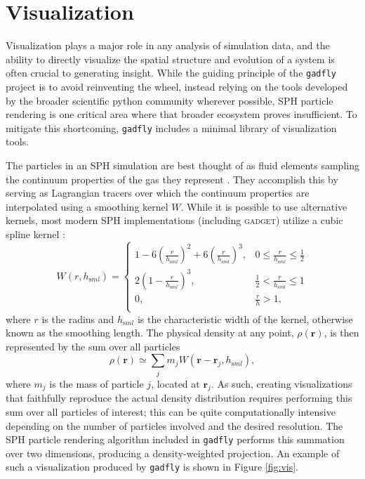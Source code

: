 \documentclass{thesis}
\newcommand{\code}[1]{\texttt{#1}}
\begin{document}
\section{Visualization}
\label{sec:vis}
Visualization plays a major role in any analysis of simulation data, and the ability to directly visualize the spatial structure and evolution of a system is often crucial to generating insight.
While the guiding principle of the \code{gadfly} project is to avoid reinventing the wheel, instead relying on the tools developed by the broader scientific python community wherever possible, SPH particle rendering is one critical area where that broader ecosystem proves insufficient.  
To mitigate this shortcoming, \code{gadfly} includes a minimal library of visualization tools.

The particles in an SPH simulation are best thought of as fluid elements sampling the continuum properties of the gas they represent \citep{Lucy1977,GingoldMonaghan1977,Monaghan1992,Springel2010}.  They accomplish this by serving as Lagrangian tracers over which the continuum properties are interpolated using a smoothing kernel $W$. While it is possible to use alternative kernels, most modern SPH implementations (including \textsc{gadget}) utilize a cubic spline kernel \citep{Springel2014}: 
\begin{equation}
W(r,h_{\mathrm sml}) =
     \begin{cases}
       1 - 6 \left( \frac{r}{h_{\mathrm sml}} \right)^2 + 6 \left( \frac{r}{h_{\mathrm sml}} \right)^3, & 0 \leq \frac{r}{h_{\mathrm sml}} \leq \frac{1}{2}\\
       2 \left(1 - \frac{r}{h_{\mathrm sml}}\right)^3, & \frac{1}{2} < \frac{r}{h_{\mathrm sml}} \leq 1\\
       0, & \frac{r}{h} >  1,\\
     \end{cases}
\end{equation}
where $r$ is the radius and $h_{\mathrm sml}$ is the characteristic width of the kernel, otherwise known as the smoothing length.  The physical density at any point, $\rho(\mathbf{r})$, is then represented by the sum over all particles
\begin{equation}
\rho({\mathbf r}) \simeq \sum_j m_j W({\mathbf r} - {\mathbf r}_j, h_{\mathrm sml}),
\end{equation}
where $m_j$ is the mass of particle $j$, located at ${\mathbf r}_j$.
As such, creating visualizations that faithfully reproduce the actual density distribution requires performing this sum over all particles of interest; this can be quite computationally intensive depending on the number of particles involved and the desired resolution.
The SPH particle rendering algorithm included in \code{gadfly} performs this summation over two dimensions, producing a density-weighted projection. An example of such a visualization produced by \code{gadfly} is shown in Figure \ref{fig:vis}.
\end{document}
